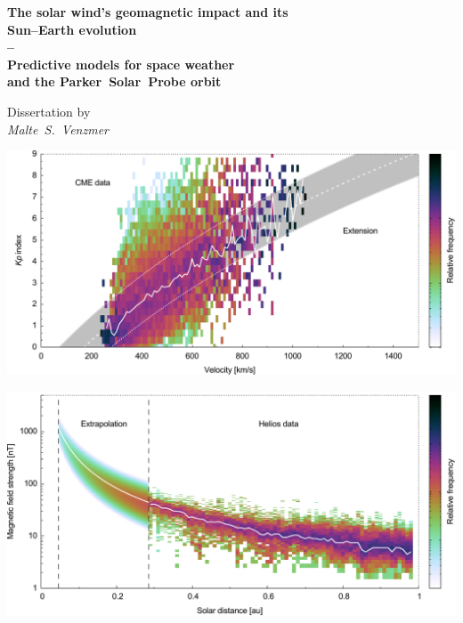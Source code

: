 

\vfill

\begin{titlepage}
	
\end{titlepage}

\begin{center}
	{\LARGE\sffamily
		\textbf{The solar wind's geomagnetic impact and its\\Sun--Earth evolution\\--\\Predictive models for space weather\\and the Parker~Solar~Probe orbit}\\
	}
	\renewcommand{\baselinestretch}{1.5}
	
	\vspace{3\baselineskip}
	\Large\rmfamily
	Dissertation by\\
	
	\textit{Malte~S.~Venzmer}\\
	
	\vspace{2\baselineskip}
	
	\begin{minipage}{0.9\textwidth}
		\includegraphics[width=\textwidth]{figures_of_mine/gnuplots/titlepage_plot_ch2_kpvsv_cmes_c2.pdf}
	\end{minipage}
	
	\vspace{0.5\baselineskip}
	
	\begin{minipage}{0.9\textwidth}
		\includegraphics[width=\textwidth]{figures_of_mine/gnuplots/fit_fixed_B_paper_h_title.pdf}
	\end{minipage}
\end{center}
\vfill

